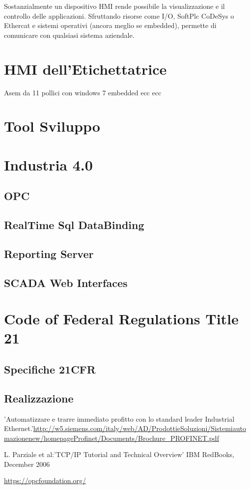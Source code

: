 \documentclass[12pt, a4paper, oneside]{book}
\begin{document}
Sostanzialmente un dispositivo HMI rende possibile la visualizzazione e il controllo delle applicazioni. Sfruttando risorse come I/O, SoftPlc CoDeSys o Ethercat e sistemi operativi (ancora meglio se embedded), permette di comunicare con qualsiasi sistema aziendale.


\section{HMI dell'Etichettatrice}
Asem da 11 pollici con windows 7 embedded ecc ecc
\section{Tool Sviluppo}
\section{Industria 4.0}
\subsection{OPC}
\subsection{RealTime Sql DataBinding}
\subsection{Reporting Server}
\subsection{SCADA Web Interfaces}

\section{Code of Federal Regulations Title 21}
\subsection{Specifiche 21CFR}
\subsection{Realizzazione}






\newpage
\begin{thebibliography}{100}
	'Automatizzare e trarre immediato profitto con lo standard leader Industrial Ethernet.'\url{http://w5.siemens.com/italy/web/AD/ProdottieSoluzioni/Sistemiautomazionenew/homepageProfinet/Documents/Brochure_PROFINET.pdf}	
	
	L. Parziale et al:'TCP/IP Tutorial and Technical Overview' IBM RedBooks, December 2006
	
	\url{https://opcfoundation.org/}
	
	
	

	
\end{thebibliography}
\end{document}
